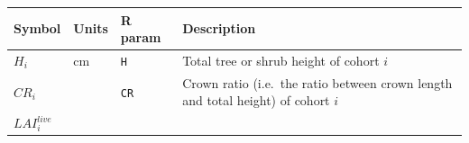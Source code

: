 \documentclass[]{book}
\begin{document}
\begin{longtable}[]{@{}llll@{}}
\toprule
\begin{minipage}[b]{0.11\columnwidth}\raggedright\strut
Symbol\strut
\end{minipage} & \begin{minipage}[b]{0.10\columnwidth}\raggedright\strut
Units\strut
\end{minipage} & \begin{minipage}[b]{0.12\columnwidth}\raggedright\strut
R param\strut
\end{minipage} & \begin{minipage}[b]{0.45\columnwidth}\raggedright\strut
Description\strut
\end{minipage}\tabularnewline
\midrule
\endhead
\begin{minipage}[t]{0.11\columnwidth}\raggedright\strut
\(H_i\)\strut
\end{minipage} & \begin{minipage}[t]{0.10\columnwidth}\raggedright\strut
cm\strut
\end{minipage} & \begin{minipage}[t]{0.12\columnwidth}\raggedright\strut
\texttt{H}\strut
\end{minipage} & \begin{minipage}[t]{0.45\columnwidth}\raggedright\strut
Total tree or shrub height of cohort \(i\)\strut
\end{minipage}\tabularnewline
\begin{minipage}[t]{0.11\columnwidth}\raggedright\strut
\(CR_i\)\strut
\end{minipage} & \begin{minipage}[t]{0.10\columnwidth}\raggedright\strut
\strut
\end{minipage} & \begin{minipage}[t]{0.12\columnwidth}\raggedright\strut
\texttt{CR}\strut
\end{minipage} & \begin{minipage}[t]{0.45\columnwidth}\raggedright\strut
Crown ratio (i.e.~the ratio between crown length and total height) of
cohort \(i\)\strut
\end{minipage}\tabularnewline
\begin{minipage}[t]{0.11\columnwidth}\raggedright\strut
\(LAI^{live}_i\)\strut
\end{minipage} & \begin{minipage}[t]{0.10\columnwidth}\raggedright\strut
\strut
\end{minipage} & \begin{minipage}[t]{0.12\columnwidth}\raggedright\strut

\end{minipage}
\end{longtable}
\end{document}
